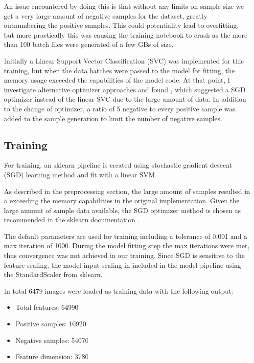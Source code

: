 An issue encountered by doing this is that without any limits on sample size we get a very large amount of negative samples for the dataset, greatly outnumbering the positive samples.
This could potentiality lead to overfitting, but more practically this was causing the training notebook to crash as the more than 100 batch files were generated of a few GBs of size. 

Initially a Linear Support Vector Classification (SVC)  was implemented for this training, but when the data batches were passed to the model for fitting, the memory usage exceeded the capabilities of the model code. 
At that point, I investigate alternative optimizer approaches and found \cite{sascha2017svm}, which suggested a SGD optimizer instead of the linear SVC due to the large amount of data.
In addition to the change of optimizer, a ratio of 5 negative to every positive sample was added to the sample generation to limit the number of negative samples.

\subsection{Training}

For training, an sklearn \cite{scikit-learn} pipeline is created using stochastic gradient descent (SGD) learning method and fit with a linear SVM. 

As described in the preprocessing section, the large amount of samples resulted in a exceeding the memory capabilities in the original implementation.
Given the large amount of sample data available, the SGD optimizer method is chosen as recommended in the sklearn documentation \cite{scikit-learn-map}.

The default parameters are used for training including a tolerance of 0.001 and a max iteration of 1000.
During the model fitting step the max iterations were met, thus convergence was not achieved in our training. 
Since SGD is sensitive to the feature scaling, the model input scaling in included in the model pipeline using the StandardScaler from sklearn.

In total 6479 images were loaded as training data with the following output:
\begin{itemize}
    \item Total features: 64990
    \item Positive samples: 10920
    \item Negative samples: 54070
    \item Feature dimension: 3780
\end{itemize}
